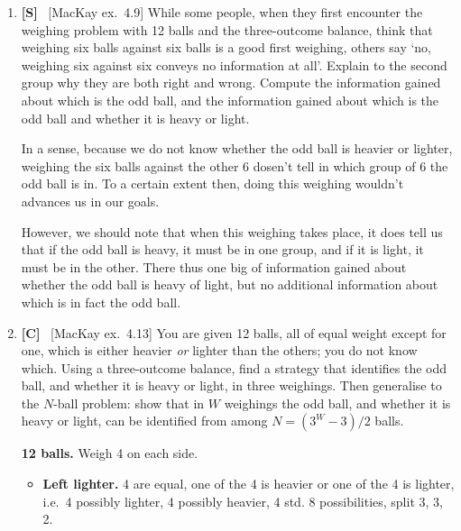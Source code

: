 \documentclass[10pt,\jkfside,a4paper]{article}
\newcommand{\answer}[1]{
    \begin{tcolorbox}[colframe=black, colback=white, sharp corners, boxrule=0.2mm, breakable]
        #1
    \end{tcolorbox}
}
\newcommand{\qtype}[1]{\textbf{[#1]}~}
\begin{document}
\begin{enumerate}
{\begin{itemize}
            \item \textbf{Right} \hfill $\log \frac{1}{3}$
            \begin{itemize}
                \item Left \hfill $\log 1$
                \item Right
                \item Centre
            \end{itemize}
        \end{itemize}
    }

    \item
    \qtype{S}
    [MacKay ex.~4.9] While some people, when they first encounter the weighing problem with 12 balls and the three-outcome balance, think that weighing six balls against six balls is a good first weighing, others say `no, weighing six against six conveys no information at all'. Explain to the second group why they are both right and wrong. Compute the information gained about which is the odd ball, and the information gained about which is the odd ball and whether it is heavy or light.

    \answer{
        In a sense, because we do not know whether the odd ball is heavier or lighter, weighing the six balls against the other 6 dosen't tell in which group of 6 the odd ball is in. To a certain extent then, doing this weighing wouldn't advances us in our goals. 

        However, we should note that when this weighing takes place, it does tell us that if the odd ball is heavy, it must be in one group, and if it is light, it must be in the other. There thus one big of information gained about whether the odd ball is heavy of light, but no additional information about which is in fact the odd ball. 
    }

    \item
    \qtype{C}
    [MacKay ex.~4.13] You are given 12 balls, all of equal weight except for one, which is either heavier \emph{or} lighter than the others; you do not know which. Using a three-outcome balance, find a strategy that identifies the odd ball, and whether it is heavy or light, in three weighings. Then generalise to the $N$-ball problem: show that in $W$ weighings the odd ball, and whether it is heavy or light, can be identified from among $N = (3^W - 3)/2$ balls.

    \answer{
        \textbf{12 balls.} Weigh 4 on each side.

        \begin{itemize}
            \item \textbf{Left lighter.} 4 are equal, one of the 4 is heavier or one of the 4 is lighter, i.e.\ 4 possibly lighter, 4 possibly heavier, 4 std. 8 possibilities, split 3, 3, 2.


\end{itemize}}
\end{enumerate}
\end{document}
